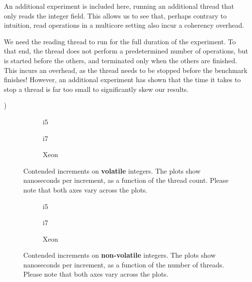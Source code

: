 An additional experiment is included here, running an additional thread that
only reads the integer field. This allows us to see that, perhaps contrary to
intuition, read operations in a multicore setting also incur a coherency
overhead.


We need the reading thread to run for the full duration of the experiment. To
that end, the thread does not perform a predetermined number of operations, but
is started before the others, and terminated only when the others are
finished. This incurs an overhead, as the thread needs to be stopped before the
benchmark finishes! However, an additional experiment has shown that the time it
takes to stop a thread is far too small to significantly skew our results.

)

\begin{figure}[hbpt]
	\graphicspath{{plots/}}
	\begin{subfigure}{0.5\textwidth}
		
		\caption{i5}
	\end{subfigure}
	\begin{subfigure}{0.5\textwidth}
		
		\caption{i7}
	\end{subfigure}
	\begin{subfigure}{1\textwidth}
		
		\caption{Xeon}
	\end{subfigure}
	\caption{Contended increments on \textbf{volatile} integers. The plots show
	nanoseconds per increment, as a function of the thread count.
	Please note that both axes vary across the plots.}
	\label{fig:cont}
\end{figure}

\begin{figure}[hbpt]
	\graphicspath{{plots/}}
	\begin{subfigure}{0.5\textwidth}
		
		\caption{i5}
	\end{subfigure}
	\begin{subfigure}{0.5\textwidth}
		
		\caption{i7}
	\end{subfigure}
	\begin{subfigure}{1\textwidth}
		
		\caption{Xeon}
	\end{subfigure}
	\caption{Contended increments on \textbf{non-volatile} integers. The
	plots show nanoseconds per increment, as a function of the number of
	threads. Please note that both axes vary across the plots.}
	\label{fig:cont-nob}
\end{figure}

